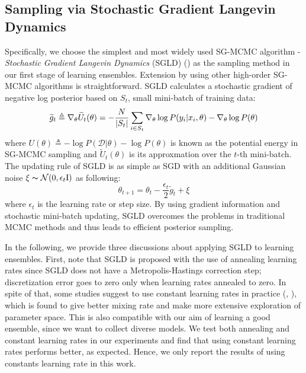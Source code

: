 \documentclass{article} %
\begin{document}
\subsection{Sampling via Stochastic Gradient Langevin Dynamics}
\label{SGLD}
Specifically, we choose the simplest and most widely used SG-MCMC algorithm - \textit{Stochastic Gradient Langevin Dynamics} (SGLD) (\citet{welling2011bayesian}) as the sampling method in our first stage of learning ensembles.
Extension by using other high-order SG-MCMC algorithms is straightforward. 
SGLD calculates a stochastic gradient of negative log posterior based on $ S_t $, small mini-batch of training data:
\begin{equation}
\label{eq2}
\widetilde{g}_t \triangleq \nabla_{\theta}\widetilde{U}_t(\theta) = 
-\frac{N}{|S_t|}\sum_{i\in S_t}\nabla_{\theta}\log P(\mathnormal{y}_i|x_i, \theta) 
-\nabla_{\theta}\log P(\theta)
\end{equation} 
where 
$ U(\theta) \triangleq 
-\log P(\mathcal{D}|\theta)  -\log P(\theta) $ is known as the potential energy in SG-MCMC sampling and 
$ \widetilde{U}_t(\theta) $ is its approxmation over the $ t $-th mini-batch.
The updating rule of SGLD is as simple as SGD with an additional Gaussian noise
$ \xi\thicksim\mathcal{N}(0,\epsilon_t\rm{I}) $ as following:
\begin{equation}
\label{eq3}
\theta_{t+1} = \theta_{t} - \frac{\epsilon_t}{2}\widetilde{g}_t
+\xi
\end{equation}
where $ \epsilon_t $ is the learning rate or step size. By using gradient information and stochastic mini-batch updating, SGLD overcomes the problems in traditional MCMC methods and thus leads to efficient  posterior sampling.

In the following, we provide three discussions about applying SGLD to learning ensembles. First, note that SGLD is proposed with the use of annealing learning rates
since SGLD does not have a Metropolis-Hastings correction step; discretization error goes to zero only when learning rates annealed to zero. In spite of that, some studies suggest to use constant learning rates in practice (\citet{sato2014approximation}, \citet{chaudhari2016entropy}), which is found to give better mixing rate and make more extensive exploration of parameter space.
This is also compatible with our aim of learning a good ensemble, since we want to collect diverse models.
We test both annealing and constant learning rates in our experiments and find that using constant learning rates performs better, as expected. Hence, we only report the results of using constants learning rate in this work. 
\end{document}
